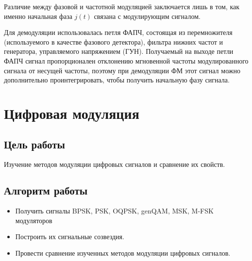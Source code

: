 \documentclass[10pt,a4paper]{article}
\begin{document}
Различие между фазовой и частотной модуляцией заключается лишь в том, как именно начальная фаза $j(t)$ связана с модулирующим сигналом.

Для демодуляции использовалась петля ФАПЧ, состоящая из перемножителя (используемого в качестве фазового детектора), фильтра нижних частот и генератора, управляемого напряжением (ГУН). Получаемый на выходе петли ФАПЧ сигнал пропорционален отклонению мгновенной частоты модулированного сигнала от несущей частоты, поэтому при демодуляции ФМ этот сигнал можно дополнительно проинтегрировать, чтобы получить начальную фазу сигнала.

\section{Цифровая модуляция}
\subsection{Цель работы}
Изучение методов модуляции цифровых сигналов и сравнение их свойств. 
\subsection{Алгоритм работы}
\begin{itemize}
\item Получить сигналы BPSK, PSK, OQPSK, genQAM, MSK, M-FSK модуляторов 
\item Построить их сигнальные созвездия. 
\item Провести сравнение изученных методов модуляции цифровых сигналов. 
\end{itemize}
\end{document}
